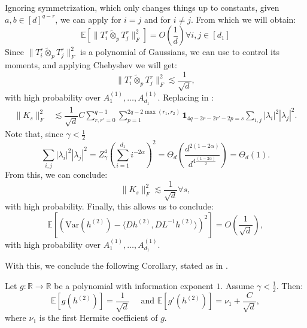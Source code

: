 \documentclass[]{article}
\makeatletter
\numberwithin{equation}{section}
\theoremstyle{definition}
\renewenvironment{proof}[1][\proofname]{\par
  \pushQED{\qed}%
  \normalfont \topsep6\p@\@plus6\p@\relax
  \trivlist
  \item[\hskip\labelsep\textbf{#1.}]\ignorespaces
}{%
  \popQED\endtrivlist\@endpefalse
}
\newcommand{\RR}{\mathbb{R}}
\newcommand{\EE}{\mathbb{E}}
\makeatother
\begin{document}
\begin{proof}
Ignoring symmetrization, which only changes things up to constants, given $a, b \in [d]^{q-r}$, we can apply  for $i=j$ and  for $i \not = j$. From which we will obtain: 
\begin{equation}
    \EE \left [\|T^r_i \tilde{\otimes}_{p} T^{r}_j\|_{F}^{2} \right ] = O\left (\dfrac{1}{d} \right ) \forall i,j \in [d_1]
\end{equation}
Since $\|T^r_i \tilde{\otimes}_{p} T^{r}_j\|_{F}^{2}$ is a polynomial of Gaussians, we can use  to control its moments, and applying Chebyshev we will get: 
\begin{equation}
    \|T^r_i \tilde{\otimes}_{p} T^{r}_j\|_{F}^2 \lesssim \dfrac{1}{\sqrt{d}},
\end{equation}
with high probability over $A_1^{(1)}, \dots, A^{(1)}_{d_1}$. Replacing in :
\begin{align}
    \| K_{s}\|_{F}^{2} & \lesssim \dfrac{1}{\sqrt{d}}C \sum_{r,r'= 0}^{q-1} \sum_{p=1}^{2q-2\max(r_1, r_2)}\mathbf{1}_{4q-2r-2r'-2p = s} \sum_{i,j} |\lambda_i|^2 |\lambda_j|^2.
\end{align}
Note that, since $\gamma < \frac{1}{2}$
\begin{equation}
    \sum_{i,j} |\lambda_i|^2 |\lambda_j|^2 = Z_{\gamma}^{4} \left (\sum_{i =1}^{d_1} i^{-2\alpha} \right )^2 = \Theta_{d}\left ( \dfrac{d^{2(1-2\alpha)}}{d^{4\frac{(1-2\alpha)}{2}}}\right ) = \Theta_{d}(1). 
\end{equation}
From this, we can conclude: 
\begin{equation}
    \| K_{s}\|_{F}^{2} \lesssim \dfrac{1}{\sqrt{d}} \forall s,
\end{equation}
with high probability. Finally, this allows us to conclude:
\begin{equation}
    \EE \left[ \left (\mathrm{Var}(h^{(2)}) - \langle Dh^{(2)}, DL^{-1}h^{(2)}\rangle \right )^{2}\right ] = O \left ( \dfrac{1}{\sqrt{d}}\right ),
\end{equation}
with high probability over $A_1^{(1)}, \dots, A^{(1)}_{d_1}$. 
\end{proof}

With this, we conclude the following Corollary, stated as  in . 
\begin{corollary}
    Let $g:\RR \to \RR$ be a polynomial with information exponent $1$. Assume $\gamma < \frac{1}{2}$. Then:
    \begin{equation}
        \EE[g(h^{(2)})]= \dfrac{1}{\sqrt{d}} \quad \text{ and } \EE \left[ g'(h^{(2)}) \right ] = \nu_{1} + \dfrac{C}{\sqrt{d}},
    \end{equation}
    where $\nu_1$ is the first Hermite coefficient of $g$. 
    \label{Cor:information_exponent_g}
\end{corollary}
\end{document}
